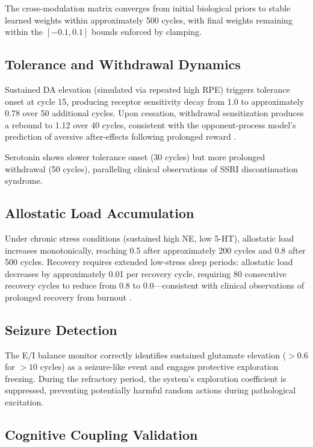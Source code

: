 \documentclass[11pt,a4paper]{article}
\begin{document}
The cross-modulation matrix converges from initial biological priors to stable learned weights within approximately 500 cycles, with final weights remaining within the $[-0.1, 0.1]$ bounds enforced by clamping.

\subsection{Tolerance and Withdrawal Dynamics}

Sustained DA elevation (simulated via repeated high RPE) triggers tolerance onset at cycle 15, producing receptor sensitivity decay from 1.0 to approximately 0.78 over 50 additional cycles. Upon cessation, withdrawal sensitization produces a rebound to 1.12 over 40 cycles, consistent with the opponent-process model's prediction of aversive after-effects following prolonged reward \citep{koob2001}.

Serotonin shows slower tolerance onset (30 cycles) but more prolonged withdrawal (50 cycles), paralleling clinical observations of SSRI discontinuation syndrome.

\subsection{Allostatic Load Accumulation}

Under chronic stress conditions (sustained high NE, low 5-HT), allostatic load increases monotonically, reaching 0.5 after approximately 200 cycles and 0.8 after 500 cycles. Recovery requires extended low-stress sleep periods: allostatic load decreases by approximately 0.01 per recovery cycle, requiring 80 consecutive recovery cycles to reduce from 0.8 to 0.0---consistent with clinical observations of prolonged recovery from burnout \citep{mcewen1998}.

\subsection{Seizure Detection}

The E/I balance monitor correctly identifies sustained glutamate elevation ($> 0.6$ for $> 10$ cycles) as a seizure-like event and engages protective exploration freezing. During the refractory period, the system's exploration coefficient is suppressed, preventing potentially harmful random actions during pathological excitation.

\subsection{Cognitive Coupling Validation}
\end{document}
